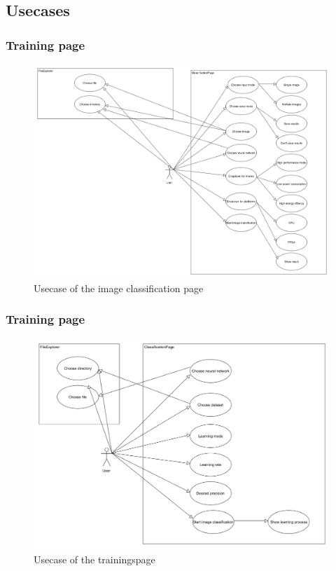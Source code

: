 \documentclass[parskip=full]{scrartcl}
\begin{document}
\subsection{Usecases}
\subsubsection{Training page}
\begin{figure}[htb!]
\centering
\includegraphics[width=\textwidth]{ClassificationUsecase}
\caption{Usecase of the image classification page}
\end{figure}
\subsubsection{Training page}
\begin{figure}[htb!]
\centering
\includegraphics[width=\textwidth]{TrainUsecase}
\caption{Usecase of the trainingspage}
\end{figure}
\clearpage
\end{document}
